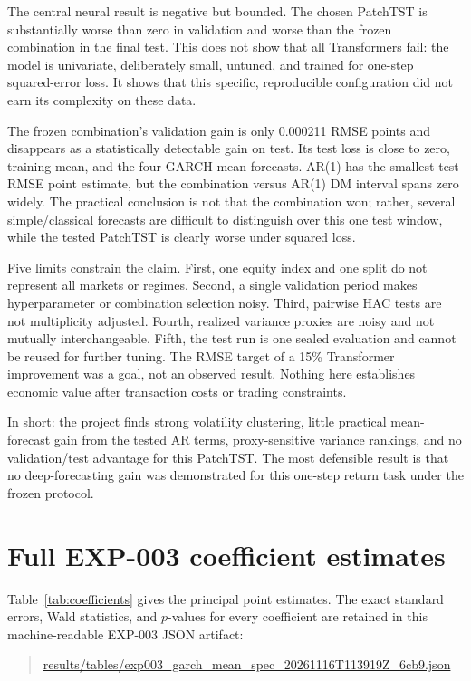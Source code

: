 \documentclass[11pt,a4paper]{article}
\begin{document}
The central neural result is negative but bounded. The chosen PatchTST is substantially worse
than zero in validation and worse than the frozen combination in the final test. This does not
show that all Transformers fail: the model is univariate, deliberately small, untuned, and
trained for one-step squared-error loss. It shows that this specific, reproducible configuration
did not earn its complexity on these data.

The frozen combination's validation gain is only 0.000211 RMSE points and disappears as a
statistically detectable gain on test. Its test loss is close to zero, training mean, and the
four GARCH mean forecasts. AR(1) has the smallest test RMSE point estimate, but the combination
versus AR(1) DM interval spans zero widely. The practical conclusion is not that the combination
won; rather, several simple/classical forecasts are difficult to distinguish over this one test
window, while the tested PatchTST is clearly worse under squared loss.

Five limits constrain the claim. First, one equity index and one split do not represent all
markets or regimes. Second, a single validation period makes hyperparameter or combination
selection noisy. Third, pairwise HAC tests are not multiplicity adjusted. Fourth, realized
variance proxies are noisy and not mutually interchangeable. Fifth, the test run is one sealed
evaluation and cannot be reused for further tuning. The RMSE target of a 15\% Transformer
improvement was a goal, not an observed result. Nothing here establishes economic value after
transaction costs or trading constraints.

In short: the project finds strong volatility clustering, little practical mean-forecast gain
from the tested AR terms, proxy-sensitive variance rankings, and no validation/test advantage
for this PatchTST. The most defensible result is that no deep-forecasting gain was demonstrated
for this one-step return task under the frozen protocol.

\appendix
\section{Full EXP-003 coefficient estimates}
Table~\ref{tab:coefficients} gives the principal point estimates. The exact standard errors,
Wald statistics, and $p$-values for every coefficient are retained in this machine-readable
EXP-003 JSON artifact:
\begin{quote}\small\url{results/tables/exp003_garch_mean_spec_20261116T113919Z_6cb9.json}\end{quote}
\end{document}
